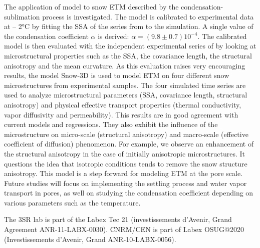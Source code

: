 \documentclass[draft,ms]{agujournal2019}
\begin{document}
The application of  model to snow ETM described by the condensation-sublimation process is investigated. The model is calibrated to experimental data at – 2°C by fitting the SSA of the series from  to the simulation. A single value of the condensation coefficient $\alpha$ is derived: $\alpha = ( 9.8 \pm 0.7) 10^{-4}$. The calibrated model is then evaluated with the independent experimental series of  by looking at microstructural properties such as the SSA, the covariance length, the structural anisotropy and the mean curvature. As this evaluation raises very encouraging results, the model Snow-3D is used to model ETM on four different snow microstructures from experimental samples. The four simulated time series are used to analyze microstructural parameters (SSA, covariance length, structural anisotropy) and physical effective transport properties (thermal conductivity, vapor diffusivity and permeability). This results are in good agreement with current models and regressions. They also exhibit the influence of the microstructure on micro-scale (structural anisotropy) and macro-scale (effective coefficient of diffusion) phenomenon. For example, we observe an enhancement of the structural anisotropy in the case of initially anisotropic microstructures. It questions the idea that isotropic conditions tends to remove the snow structure anisotropy. This model is a step forward for modeling ETM at the pore scale. Future studies will focus on implementing the settling process and water vapor transport in pores, as well on studying the condensation coefficient depending on various parameters such as the temperature.  

\acknowledgments
The 3SR lab is part of the Labex Tec 21 (investissements d'Avenir, Grand Agreement ANR-11-LABX-0030). CNRM/CEN is part of Labex OSUG@2020 (Investissements d'Avenir, Grand ANR-10-LABX-0056).


\end{document}

